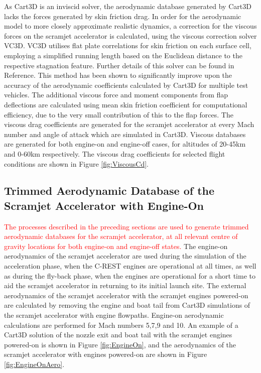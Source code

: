 		As Cart3D is an inviscid solver, the aerodynamic database generated by Cart3D lacks the forces generated by skin friction drag. In order for the aerodynamic model to more closely approximate realistic dynamics, a correction for the viscous forces on the scramjet accelerator is calculated, using the viscous correction solver VC3D\cite{Ward2018}. VC3D utilises flat plate correlations for skin friction on each surface cell, employing a simplified running length based on the Euclidean distance to the respective stagnation feature. Further details of this solver can be found in Reference\cite{Ward2018}. This method has been shown to significantly improve upon the accuracy of the aerodynamic coefficients calculated by Cart3D for multiple test vehicles\cite{Ward2018}. The additional viscous force and moment components from flap deflections are calculated using mean skin friction coefficient for computational efficiency, due to the very small contribution of this to the flap forces. The viscous drag coefficients are generated for the scramjet accelerator at every Mach number and angle of attack which are simulated in Cart3D. Viscous databases are generated for both engine-on and engine-off cases, for altitudes of 20-45km and 0-60km respectively.  The viscous drag coefficients for selected flight conditions are shown in Figure \ref{fig:ViscousCd}.
		
		
		
		
		
		\subsection{Trimmed Aerodynamic Database of the Scramjet Accelerator with Engine-On}\label{sec:trimmedongineon}

		\textcolor{red}{The processes described in the preceding sections are used to generate trimmed aerodynamic databases for the scramjet accelerator, at all relevant centre of gravity locations for both engine-on and engine-off states.}
		The engine-on aerodynamics of the scramjet accelerator are used during the simulation of the acceleration phase, when the C-REST engines are operational at all times, as well as during the fly-back phase, when the engines are operational for a short time to aid the scramjet accelerator in returning to its initial launch site.
		The external aerodynamics of the scramjet accelerator with the scramjet engines powered-on are calculated by removing the engine and boat tail from Cart3D simulations of the scramjet accelerator with engine flowpaths. Engine-on aerodynamic calculations are performed for Mach numbers 5,7,9 and 10. An example of a Cart3D solution of the nozzle exit and boat tail with the scramjet engines powered-on is shown in Figure \ref{fig:EngineOn}, and the aerodynamics of the scramjet accelerator with engines powered-on are shown in Figure \ref{fig:EngineOnAero}.
		
